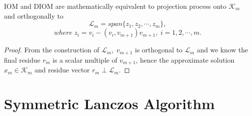 \documentclass[10pt,a4paper]{article}
\begin{document}
\begin{prop}
IOM and DIOM are mathematically equivalent to projection process onto $\mathcal{K}_m$ and orthogonally to
$$\mathcal{L}_m=span\{z_1,z_2,\cdots,z_m\},$$
$$where\;z_i=v_i-(v_i,v_{m+1})v_{m+1},\;i=1,2,\cdots,m.$$
\end{prop}

\begin{proof}
From the construction of $\mathcal{L}_m,\;v_{m+1}$ is orthogonal to $\mathcal{L}_m$ and we know the final residue $r_m$ is a scalar multiple of $v_{m+1}$, hence the approximate solution $x_m\in\mathcal{K}_m$ and residue vector $r_m\perp\mathcal{L}_m$.  
\end{proof}

\section{Symmetric Lanczos Algorithm}
\end{document}
